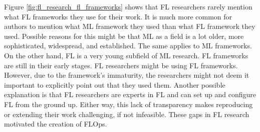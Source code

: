 Figure \ref{fig:fl_research_fl_frameworks} shows that FL researchers rarely mention what FL frameworks they use for their work.
It is much more common for authors to mention what ML framework they used than what FL framework they used.
Possible reasons for this might be that ML as a field is a lot older, more sophisticated, widespread, and established.
The same applies to ML frameworks.
On the other hand, FL is a very young subfield of ML research.
FL frameworks are still in their early stages.
FL researchers might be using FL frameworks.
However, due to the framework's immaturity, the researchers might not deem it important to explicitly point out that they used them.
Another possible explanation is that FL researchers are experts in FL and can set up and configure FL from the ground up.
Either way, this lack of transparency makes reproducing or extending their work challenging, if not infeasible.
These gaps in FL research motivated the creation of FLOps.